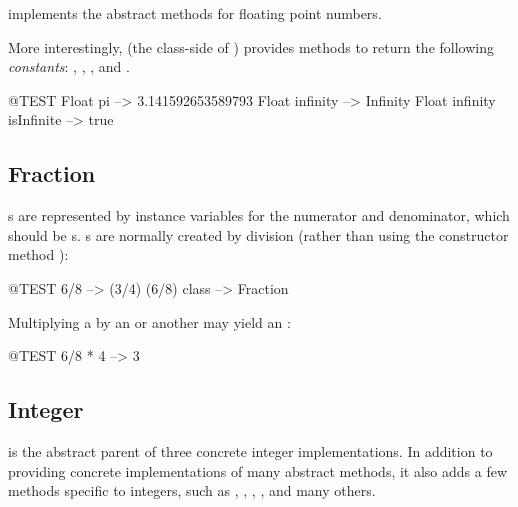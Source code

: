 \documentclass[a4paper,10pt,twoside]{book}
\begin{document}
 implements the abstract  methods for floating point numbers.

More interestingly,  (\ie the class-side of ) provides methods to return the following \emph{constants}: , , , and .

\begin{code}{@TEST}
Float pi                      --> 3.141592653589793
Float infinity               --> Infinity
Float infinity isInfinite --> true
\end{code}

\subsection{Fraction}

s are represented by instance variables for the numerator and denominator, which should be s.
s are normally created by  division (rather than using the constructor method ):

\begin{code}{@TEST}
6/8             --> (3/4)
(6/8) class --> Fraction
\end{code}

Multiplying a  by an  or another  may yield an :

\begin{code}{@TEST}
6/8 * 4 --> 3
\end{code}


\subsection{Integer}

 is the abstract parent of three concrete integer implementations.
In addition to providing concrete implementations of many abstract  methods, it also adds a few methods specific to integers, such as , , , , and many others.
\end{document}

